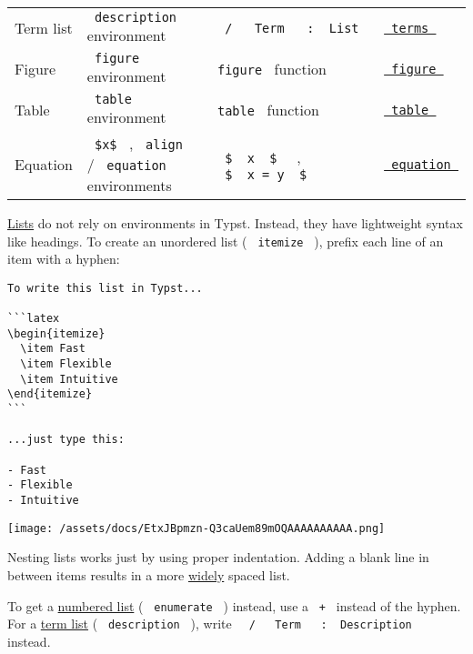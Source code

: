 \begin{longtable}[]{@{}llll@{}}
Term list & \texttt{\ description\ } environment &
\texttt{\ }{\texttt{\ /\ }}\texttt{\ }{\texttt{\ Term\ }}\texttt{\ }{\texttt{\ :\ }}\texttt{\ List\ }
& \href{/docs/reference/model/terms/}{\texttt{\ terms\ }} \\
Figure & \texttt{\ figure\ } environment & \texttt{\ figure\ } function
& \href{/docs/reference/model/figure/}{\texttt{\ figure\ }} \\
Table & \texttt{\ table\ } environment & \texttt{\ table\ } function &
\href{/docs/reference/model/table/}{\texttt{\ table\ }} \\
Equation & \texttt{\ \$x\$\ } , \texttt{\ align\ } /
\texttt{\ equation\ } environments &
\texttt{\ }{\texttt{\ \$\ }}\texttt{\ x\ }{\texttt{\ \$\ }}\texttt{\ } ,
\texttt{\ }{\texttt{\ \$\ }}\texttt{\ x\ =\ y\ }{\texttt{\ \$\ }}\texttt{\ }
& \href{/docs/reference/math/equation/}{\texttt{\ equation\ }} \\
\end{longtable}

\href{/docs/reference/model/list/}{Lists} do not rely on environments in
Typst. Instead, they have lightweight syntax like headings. To create an
unordered list ( \texttt{\ itemize\ } ), prefix each line of an item
with a hyphen:

\begin{verbatim}
To write this list in Typst...

```latex
\begin{itemize}
  \item Fast
  \item Flexible
  \item Intuitive
\end{itemize}
```

...just type this:

- Fast
- Flexible
- Intuitive
\end{verbatim}

\texttt{[image: /assets/docs/EtxJBpmzn-Q3caUem89mOQAAAAAAAAAA.png]}

Nesting lists works just by using proper indentation. Adding a blank
line in between items results in a more
\href{/docs/reference/model/list/\#parameters-tight}{widely} spaced
list.

To get a \href{/docs/reference/model/enum/}{numbered list} (
\texttt{\ enumerate\ } ) instead, use a \texttt{\ +\ } instead of the
hyphen. For a \href{/docs/reference/model/terms/}{term list} (
\texttt{\ description\ } ), write
\texttt{\ }{\texttt{\ /\ }}\texttt{\ }{\texttt{\ Term\ }}\texttt{\ }{\texttt{\ :\ }}\texttt{\ Description\ }
instead.

